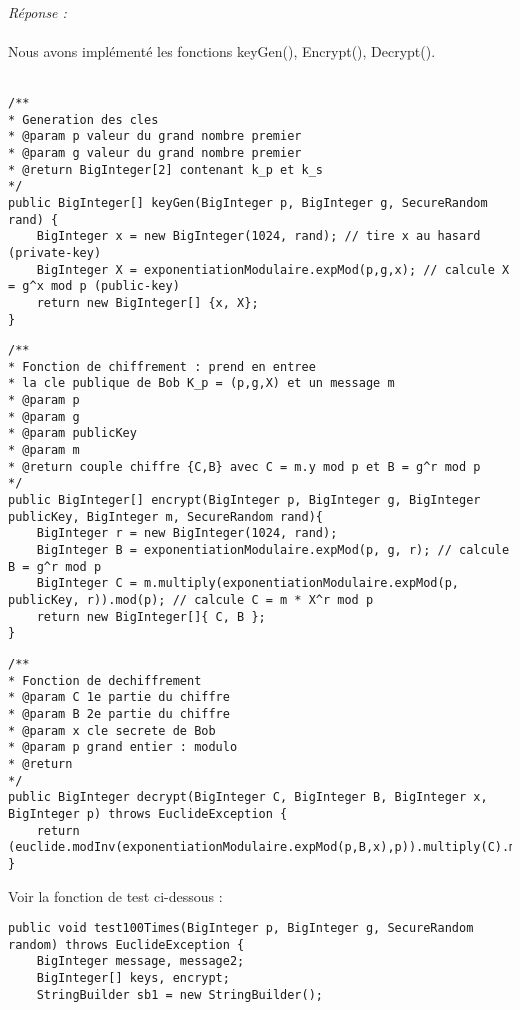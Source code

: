 \documentclass[a4paper,11pt]{article}
\begin{document}
        \textit{\\Réponse :} \\\\Nous avons implémenté les fonctions keyGen(), Encrypt(), Decrypt().\\\\\begin{lstlisting}[caption=keyGen, captionpos=b,breaklines = true]
/**
* Generation des cles
* @param p valeur du grand nombre premier
* @param g valeur du grand nombre premier
* @return BigInteger[2] contenant k_p et k_s
*/
public BigInteger[] keyGen(BigInteger p, BigInteger g, SecureRandom rand) {
    BigInteger x = new BigInteger(1024, rand); // tire x au hasard (private-key)
    BigInteger X = exponentiationModulaire.expMod(p,g,x); // calcule X = g^x mod p (public-key)
    return new BigInteger[] {x, X};
}  
\end{lstlisting}\begin{lstlisting}[caption=encrypt, captionpos=b,breaklines = true]
/**
* Fonction de chiffrement : prend en entree
* la cle publique de Bob K_p = (p,g,X) et un message m
* @param p
* @param g
* @param publicKey
* @param m
* @return couple chiffre {C,B} avec C = m.y mod p et B = g^r mod p
*/
public BigInteger[] encrypt(BigInteger p, BigInteger g, BigInteger publicKey, BigInteger m, SecureRandom rand){
    BigInteger r = new BigInteger(1024, rand);
    BigInteger B = exponentiationModulaire.expMod(p, g, r); // calcule B = g^r mod p
    BigInteger C = m.multiply(exponentiationModulaire.expMod(p, publicKey, r)).mod(p); // calcule C = m * X^r mod p
    return new BigInteger[]{ C, B };
}
\end{lstlisting}\begin{lstlisting}[caption=decrypt, captionpos=b,breaklines = true]
/**
* Fonction de dechiffrement
* @param C 1e partie du chiffre
* @param B 2e partie du chiffre
* @param x cle secrete de Bob
* @param p grand entier : modulo
* @return
*/
public BigInteger decrypt(BigInteger C, BigInteger B, BigInteger x, BigInteger p) throws EuclideException {
    return (euclide.modInv(exponentiationModulaire.expMod(p,B,x),p)).multiply(C).mod(p);
}
\end{lstlisting}Voir la fonction de test ci-dessous : \\\begin{lstlisting}[caption=Test chiffrement El-Gamal, captionpos=b,breaklines = true]
public void test100Times(BigInteger p, BigInteger g, SecureRandom random) throws EuclideException {
    BigInteger message, message2;
    BigInteger[] keys, encrypt;
    StringBuilder sb1 = new StringBuilder();


\end{lstlisting}
\end{document}
